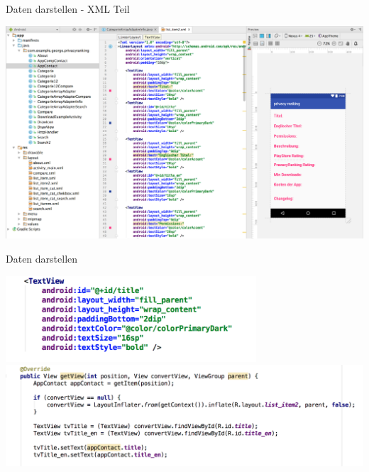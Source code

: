 \documentclass[compress,t]{beamer}
\begin{document}
\begin{frame}[fragile]{Daten darstellen - XML Teil}
    
    \includegraphics[width=1.0\textwidth]{img/xml_1.png}        

\end{frame}

\begin{frame}[fragile]{Daten darstellen}
     
    \includegraphics[width=0.7\textwidth]{img/xml_2.png}\\
    \includegraphics[width=1.0\textwidth]{img/adapter.png}    

\end{frame}
\end{document}
